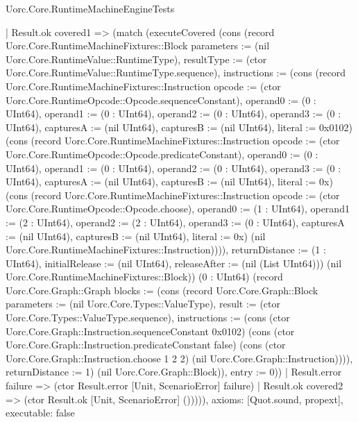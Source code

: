 \begin{lexlean}{Uorc.Core.RuntimeMachineEngineTests}
\begin{semanticmodule}
{      | Result.ok covered1 => (match (executeCovered (cons (record Uorc.Core.RuntimeMachineFixtures::Block {parameters := (nil Uorc.Core.RuntimeValue::RuntimeType), resultType := (ctor Uorc.Core.RuntimeValue::RuntimeType.sequence), instructions := (cons (record Uorc.Core.RuntimeMachineFixtures::Instruction {opcode := (ctor Uorc.Core.RuntimeOpcode::Opcode.sequenceConstant), operand0 := (0 : UInt64), operand1 := (0 : UInt64), operand2 := (0 : UInt64), operand3 := (0 : UInt64), capturesA := (nil UInt64), capturesB := (nil UInt64), literal := 0x0102}) (cons (record Uorc.Core.RuntimeMachineFixtures::Instruction {opcode := (ctor Uorc.Core.RuntimeOpcode::Opcode.predicateConstant), operand0 := (0 : UInt64), operand1 := (0 : UInt64), operand2 := (0 : UInt64), operand3 := (0 : UInt64), capturesA := (nil UInt64), capturesB := (nil UInt64), literal := 0x}) (cons (record Uorc.Core.RuntimeMachineFixtures::Instruction {opcode := (ctor Uorc.Core.RuntimeOpcode::Opcode.choose), operand0 := (1 : UInt64), operand1 := (2 : UInt64), operand2 := (2 : UInt64), operand3 := (0 : UInt64), capturesA := (nil UInt64), capturesB := (nil UInt64), literal := 0x}) (nil Uorc.Core.RuntimeMachineFixtures::Instruction)))), returnDistance := (1 : UInt64), initialRelease := (nil UInt64), releaseAfter := (nil (List UInt64))}) (nil Uorc.Core.RuntimeMachineFixtures::Block)) (0 : UInt64) (record Uorc.Core.Graph::Graph {blocks := (cons (record Uorc.Core.Graph::Block {parameters := (nil Uorc.Core.Types::ValueType), result := (ctor Uorc.Core.Types::ValueType.sequence), instructions := (cons (ctor Uorc.Core.Graph::Instruction.sequenceConstant 0x0102) (cons (ctor Uorc.Core.Graph::Instruction.predicateConstant false) (cons (ctor Uorc.Core.Graph::Instruction.choose 1 2 2) (nil Uorc.Core.Graph::Instruction)))), returnDistance := 1}) (nil Uorc.Core.Graph::Block)), entry := 0}))
        | Result.error failure => (ctor Result.error [Unit, ScenarioError] failure)
        | Result.ok covered2 => (ctor Result.ok [Unit, ScenarioError] ())))),
  axioms: [Quot.sound, propext],
  executable: false
}


\end{semanticmodule}
\end{lexlean}
